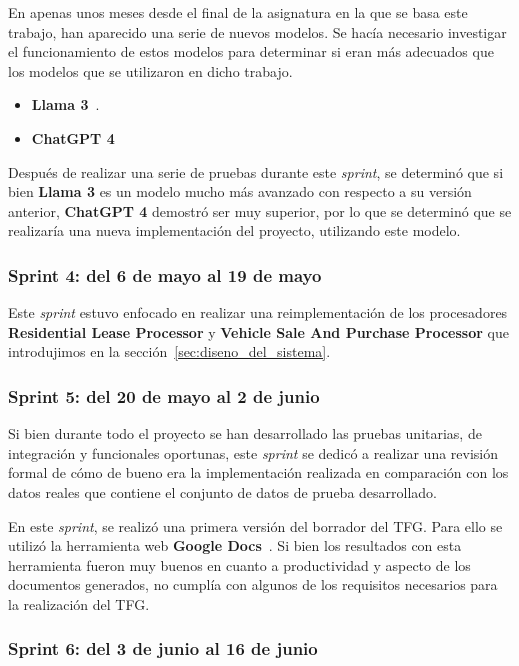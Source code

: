En apenas unos meses desde el final de la asignatura en la que se basa este trabajo, han aparecido una serie de nuevos
modelos.
Se hacía necesario investigar el funcionamiento de estos modelos para determinar si eran más adecuados que los modelos
que se utilizaron en dicho trabajo.

\begin{itemize}
    \item \textbf{Llama 3}~\cite{url_llama3}.
    \item \textbf{ChatGPT 4}~\cite{url_gpt4}
\end{itemize}

Después de realizar una serie de pruebas durante este \textit{sprint}, se determinó que si bien \textbf{Llama 3} es un
modelo mucho más avanzado con respecto a su versión anterior, \textbf{ChatGPT 4} demostró ser muy superior, por lo que
se determinó que se realizaría una nueva implementación del proyecto, utilizando este modelo.

\subsubsection{Sprint 4: del 6 de mayo al 19 de mayo}

Este \textit{sprint} estuvo enfocado en realizar una reimplementación de los procesadores
\textbf{Residential Lease Processor} y \textbf{Vehicle Sale And Purchase Processor} que introdujimos en la
sección~\ref{sec:diseno_del_sistema}.

\subsubsection{Sprint 5: del 20 de mayo al 2 de junio}

Si bien durante todo el proyecto se han desarrollado las pruebas unitarias, de integración y funcionales oportunas, este
\textit{sprint} se dedicó a realizar una revisión formal de cómo de bueno era la implementación realizada en comparación
con los datos reales que contiene el conjunto de datos de prueba desarrollado.

En este \textit{sprint}, se realizó una primera versión del borrador del TFG. Para ello se utilizó la herramienta web
\textbf{Google Docs}~\cite{url_google_docs}.
Si bien los resultados con esta herramienta fueron muy buenos en cuanto a productividad y aspecto de los documentos
generados, no cumplía con algunos de los requisitos necesarios para la realización del TFG.

\subsubsection{Sprint 6: del 3 de junio al 16 de junio}

